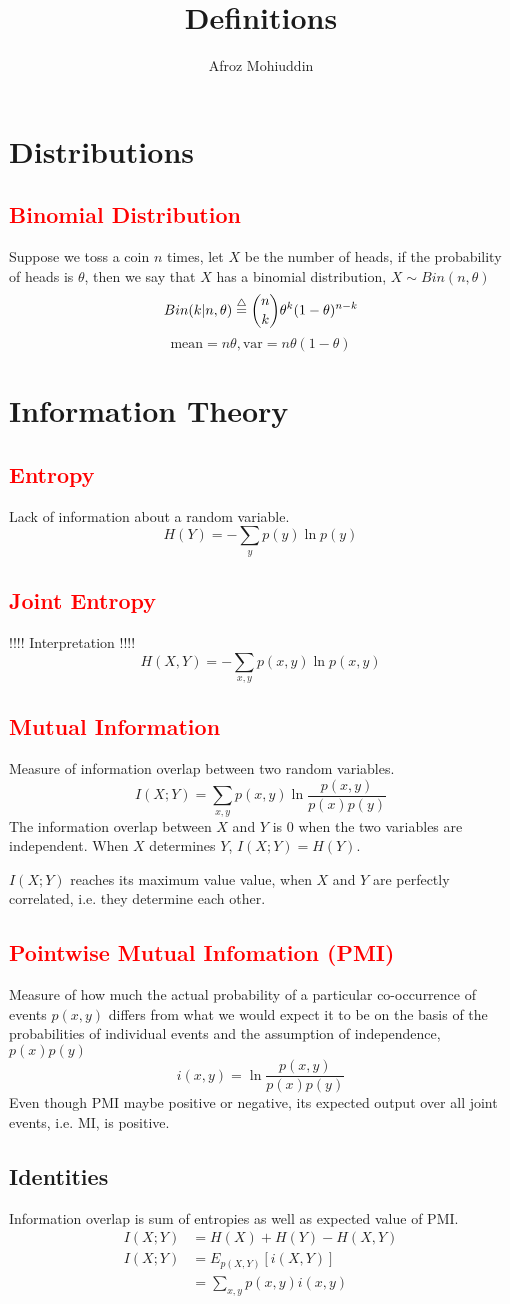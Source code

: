 \documentclass[a4paper,12pt]{article}
\title{Definitions}
\author{Afroz Mohiuddin}
\newcommand{\afrodef}{\buildrel\triangle\over =}
\newcommand{\afrodefine}[4]{
\subsection{\textcolor{red}{#1}}
#2
$$ \ensuremath{#3} $$
#4
}
\begin{document}
\maketitle

\tableofcontents

\section{Distributions}

\afrodefine{Binomial Distribution}{Suppose we toss a coin $n$ times, let $X$ be the number of heads, if the probability of heads is $\theta$, then we say that $X$ has a binomial distribution, $X \sim Bin(n, \theta)$}{Bin(k|n, \theta) \afrodef {n \choose k}{\theta}^k(1 - \theta)^{n - k}}{$$\text{mean} = n\theta, \text{var} = n\theta(1 - \theta)$$}



\section{Information Theory}

\afrodefine{Entropy}{Lack of information about a random variable.}{H(Y) = -\sum_{y}p(y)\ln{p(y)}}{}

\afrodefine{Joint Entropy}{ !!!! Interpretation !!!! }{H(X, Y) = -\sum_{x, y}p(x, y)\ln{p(x, y)}}{}

\afrodefine{Mutual Information}{Measure of information overlap between two random variables.}{I(X; Y) = \sum_{x, y} p(x, y)\ln{\frac{p(x, y)}{p(x)p(y)}}}{The information overlap between $X$ and $Y$ is $0$ when the two variables are independent. When $X$ determines $Y$, $I(X; Y) = H(Y)$.

$I(X; Y)$ reaches its maximum value value, when $X$ and $Y$ are perfectly correlated, i.e. they determine each other.}

\afrodefine{Pointwise Mutual Infomation (PMI)}{Measure of how much the actual probability of a particular co-occurrence of events $p(x, y)$ differs from what we would expect it to be on the basis of the probabilities of individual events and the assumption of independence, $p(x)p(y)$}{i(x, y) = \ln{\frac{p(x, y)}{p(x)p(y)}}}{Even though PMI maybe positive or negative, its expected output over all joint events, i.e. MI, is positive.}

\subsection{Identities}
Information overlap is sum of entropies as well as expected value of PMI. 
\begin{align*}
I(X; Y) & = H(X) + H(Y) - H(X, Y) \\
I(X; Y) & = E_{p(X, Y)}[i(X, Y)] \\
& = \sum_{x, y}p(x, y)i(x, y)
\end{align*}
\end{document}
